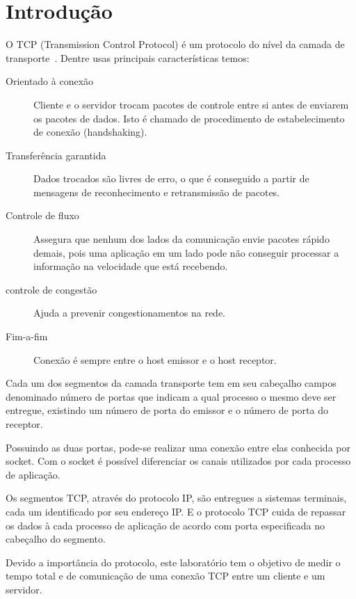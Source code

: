 \documentclass[10pt,a4paper]{article}
\begin{document}
\section{Introdução}
O TCP (Transmission Control Protocol) é um protocolo do nível da
camada de transporte~\cite{Kurose05}. Dentre usas principais características temos:
\begin{description}
\item[Orientado à conexão]  Cliente e o servidor trocam pacotes de
  controle entre si antes de enviarem os pacotes de dados. Isto é chamado de procedimento de
  estabelecimento de conexão (handshaking). 
\item[Transferência garantida] Dados trocados são livres de erro, o que é conseguido a partir de
  mensagens de reconhecimento e retransmissão de pacotes. 
\item[Controle de fluxo] Assegura que nenhum dos lados da comunicação envie pacotes rápido demais, pois uma aplicação em um
  lado pode não conseguir processar a informação na velocidade que está
  recebendo.
\item[controle de congestão] Ajuda a prevenir congestionamentos na
  rede.
\item[Fim-a-fim ] Conexão é sempre entre o host emissor e o host receptor.

\end{description}

Cada um dos segmentos da camada transporte tem em seu cabeçalho campos
denominado número de portas que indicam a qual processo o mesmo deve
ser entregue, existindo um número de porta do emissor e o número de porta do
receptor. 

Possuindo as duas portas, pode-se realizar uma conexão entre elas
conhecida por socket. Com o socket é possível diferenciar os canais
utilizados por cada processo de aplicação.

Os segmentos TCP, através do protocolo IP, são entregues a sistemas terminais, cada um
identificado por seu endereço IP. E o protocolo TCP cuida de repassar
os dados à cada processo de aplicação de acordo com porta especificada no
cabeçalho do segmento.

Devido a importância do protocolo, este laboratório tem o objetivo de
medir o tempo total e de comunicação de uma conexão TCP entre um
cliente e um servidor.

\end{document}
